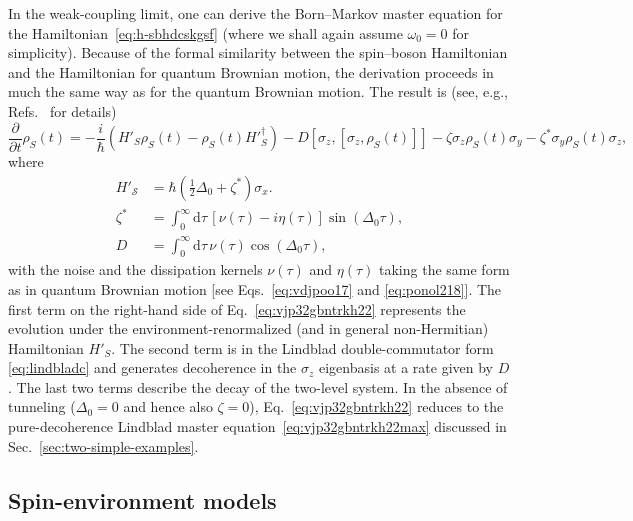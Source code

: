 \documentclass[3p,sort&compress,12pt]{elsarticle}
\newcommand{\D}{\ensuremath{\mathrm{d}}}
\newcommand{\I}{\ensuremath{i}}
\newcommand{\op}[1]{#1}
\begin{document}
In the weak-coupling limit, one can derive the Born--Markov master equation for the Hamiltonian~\eqref{eq:h-sbhdcskgsf} (where we shall again assume $\omega_0=0$ for simplicity). Because of the formal similarity between the spin--boson Hamiltonian and the Hamiltonian for quantum Brownian motion, the derivation proceeds in much the same way as for the quantum Brownian motion. The result is (see, e.g., Refs.~\cite{Paz:2001:aa,Schlosshauer:2007:un} for details)
%
\begin{equation}
\label{eq:vjp32gbntrkh22}
\frac{\partial}{\partial t} \op{\rho}_S(t) = -\frac{\I}{\hbar} \left(
  \op{H}'_S \op{\rho}_S(t) - {\op{\rho}}_S(t)
  H'^\dagger_S \right) - D \left[
  \sigma_z, \left[ \sigma_z, \op{\rho}_S(t)
  \right]\right] - \zeta \sigma_z
\op{\rho}_S(t)\sigma_y - \zeta^* \sigma_y
\op{\rho}_S(t)\sigma_z,
\end{equation}
%
where
%
\begin{subequations}
\begin{align}
  \op{H}'_\mathcal{S} &= \hbar\left(  \frac{1}{2}
  \Delta_0 + \zeta^* \right) \op{\sigma}_x. \\
  \zeta^* &= \int_0^\infty \D \tau \, \left[\nu(\tau) - \I \eta(\tau)\right] \sin\left( \Delta_0 \tau \right), \\
  D &= \int_0^\infty \D \tau \,
  \nu(\tau) \cos\left( \Delta_0 \tau \right),
\end{align}
\end{subequations}
%
with the noise and the dissipation kernels $\nu(\tau)$ and $\eta(\tau)$ taking the same form as in quantum Brownian motion [see Eqs.~\eqref{eq:vdjpoo17} and \eqref{eq:ponol218}]. The first term on the right-hand side of Eq.~\eqref{eq:vjp32gbntrkh22} represents the evolution under the environment-renormalized (and in general non-Hermitian) Hamiltonian $\op{H}'_S$. The second term is in the Lindblad double-commutator form \eqref{eq:lindbladc} and generates decoherence in the $\sigma_z$ eigenbasis at a rate given by $D$. The last two terms describe the decay of the two-level system. In the absence of tunneling ($\Delta_0=0$ and hence also $\zeta=0$), Eq.~\eqref{eq:vjp32gbntrkh22} reduces to the pure-decoherence Lindblad master equation~\eqref{eq:vjp32gbntrkh22max} discussed in Sec.~\ref{sec:two-simple-examples}.


\subsection{\label{sec:spin-envir-models}Spin-environment models}
\end{document}
